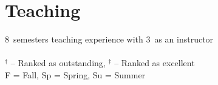 \documentclass{article}[12pt]
\begin{document}
	
	
	\section*{Teaching}
	
	\newcommand{\numSemesters}{8}
	\newcommand{\numSemInstructor}{3}
	\numSemesters~semesters teaching experience with \numSemInstructor~as an instructor\\
	\\
	$^{\dagger}$ --  Ranked as outstanding, $^{\ddagger}$ -- Ranked as excellent \\
	F = Fall, Sp = Spring, Su = Summer
	
\end{document}
